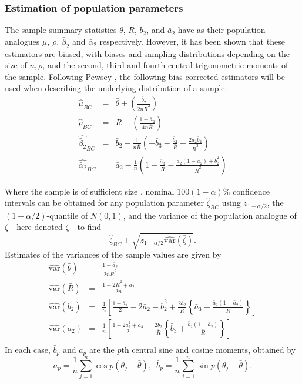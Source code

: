 \documentclass[../../ArchStats.tex]{subfiles}
\begin{document}
\subsubsection{Estimation of population parameters}
\label{sec:bias-corrected}
The sample summary statistics $\bar{\theta}$, $\bar{R}$, $\bar{b}_2$, and $\bar{a}_2$ have as their population analogues $\mu$, $\rho$, $\bar{\beta}_2$ and $\bar{\alpha}_2$ respectively. However, it has been shown \cite{Pewsey2004b} that these estimators are biased, with biases and sampling distributions depending on the size of $n, \rho$, and the second, third and fourth central trigonometric moments of the sample. Following Pewsey \cite{Pewsey2014}, the following bias-corrected estimators will be used when describing the underlying distribution of a sample:
\begin{eqnarray*}
\hat{\mu}_{BC} &=& \bar{\theta} + \left(\frac{\bar{b}_2}{2n\bar{R}^2} \right)\\[5pt]
\hat{\rho}_{BC} &=& \bar{R} - \left(\frac{1-\bar{a}_2}{4n\bar{R}}\right)\\[5pt]
\widehat{\bar{\beta}_2}_{BC} &=& \bar{b}_2 - \frac{1}{n\bar{R}} \left(-\bar{b}_3 - \frac{\bar{b}_2}{\bar{R}} + \frac{2\bar{a}_2\bar{b}_2}{\bar{R}^3}\right)\\[5pt]
\widehat{\bar{\alpha}_2}_{BC} &=& \bar{a}_2 - \frac{1}{n} \left(1-\frac{\bar{a}_3}{\bar{R}}-\frac{\bar{a}_2(1-\bar{a}_2) + \bar{b}_2^2}{\bar{R}^2}\right)
\end{eqnarray*}

Where the sample is of sufficient size , nominal $100(1-\alpha)\%$ confidence intervals can be obtained for any population parameter $\hat{\zeta}_{BC}$ using $z_{1-\alpha/2}$, the $(1-\alpha/2)$-quantile of $N(0,1)$, and the variance of the population analogue of $\zeta$ - here denoted $\bar{\zeta}$ - to find
\[\hat{\zeta}_{BC} \pm \sqrt{z_{1-\alpha/2} \widehat{\text{var}}(\bar{\zeta})}. \]
Estimates of the variances of the sample values are given by
\begin{eqnarray*}
\widehat{\text{var}}(\bar{\theta}) &=& \frac{1-\bar{a}_2}{2n\bar{R}^2} \\[5pt]
\widehat{\text{var}}(\bar{R}) &=& \frac{1-2\bar{R}^2 + \bar{a}_2}{2n} \\[5pt]
\widehat{\text{var}}(\bar{b}_2) &=& \frac{1}{n}\left[ \frac{1-\bar{a}_4}{2} - 2\bar{a}_2 - \bar{b}_2^2 + \frac{2\bar{a}_2}{\bar{R}} \left\lbrace \bar{a}_3 + \frac{\bar{a}_2 (1-\bar{a}_2)}{\bar{R}} \right\rbrace \right] \\[5pt]
\widehat{\text{var}}(\bar{a}_2) &=& \frac{1}{n}\left[ \frac{1-2\bar{a}_2^2 + \bar{a}_4}{2} + \frac{2\bar{b}_2}{\bar{R}} \left\lbrace \bar{b}_3 + \frac{\bar{b}_2 (1-\bar{a}_2)}{\bar{R}} \right\rbrace \right] \\[5pt]
\end{eqnarray*}
In each case, $\bar{b}_p$ and $\bar{a}_p$ are the $p$th central sine and cosine moments, obtained by 
\[ \bar{a}_p = \frac{1}{n} \sum_{j=1}^n \cos p(\theta_j-\bar{\theta}), \, \, \, 
\bar{b}_p = \frac{1}{n} \sum_{j=1}^n \sin p(\theta_j-\bar{\theta}).\]
\end{document}
